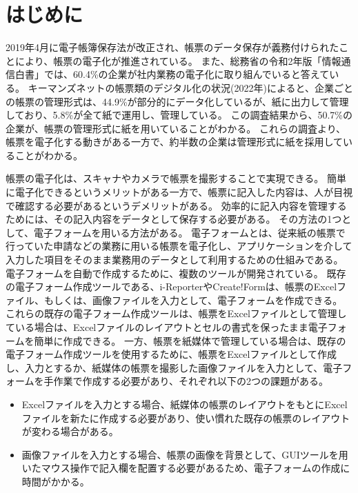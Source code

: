 \chapter{はじめに}\label{cha:Introduction}
2019年4月に電子帳簿保存法が改正され、帳票のデータ保存が義務付けられたことにより、帳票の電子化が推進されている\cite{電子帳簿保存法}。
また、総務省の令和2年版「情報通信白書」では、60.4\%の企業が社内業務の電子化に取り組んでいると答えている\cite{デジタルデータの経済的価値の計測と活用の現状に関する調査研究}。
キーマンズネットの帳票類のデジタル化の状況(2022年)によると、企業ごとの帳票の管理形式は、44.9\%が部分的にデータ化しているが、紙に出力して管理しており、5.8\%が全て紙で運用し、管理している\cite{帳票類のデジタル化の状況}。
この調査結果から、50.7\%の企業が、帳票の管理形式に紙を用いていることがわかる。
これらの調査より、帳票を電子化する動きがある一方で、約半数の企業は管理形式に紙を採用していることがわかる。

帳票の電子化は、スキャナやカメラで帳票を撮影することで実現できる。
簡単に電子化できるというメリットがある一方で、帳票に記入した内容は、人が目視で確認する必要があるというデメリットがある。
効率的に記入内容を管理するためには、その記入内容をデータとして保存する必要がある。
その方法の1つとして、電子フォームを用いる方法がある。
電子フォームとは、従来紙の帳票で行っていた申請などの業務に用いる帳票を電子化し、アプリケーションを介して入力した項目をそのまま業務用のデータとして利用するための仕組みである\cite{電子フォーム}。
電子フォームを自動で作成するために、複数のツールが開発されている。
既存の電子フォーム作成ツールである、i-Reporter\cite{i-Reporter}やCreate!Form\cite{Create!Form}は、帳票のExcelファイル、もしくは、画像ファイルを入力として、電子フォームを作成できる。
これらの既存の電子フォーム作成ツールは、帳票をExcelファイルとして管理している場合は、Excelファイルのレイアウトとセルの書式を保ったまま電子フォームを簡単に作成できる。
一方、帳票を紙媒体で管理している場合は、既存の電子フォーム作成ツールを使用するために、帳票をExcelファイルとして作成し、入力とするか、紙媒体の帳票を撮影した画像ファイルを入力として、電子フォームを手作業で作成する必要があり、それぞれ以下の2つの課題がある。

\begin{itemize}
  \item Excelファイルを入力とする場合、紙媒体の帳票のレイアウトをもとにExcelファイルを新たに作成する必要があり、使い慣れた既存の帳票のレイアウトが変わる場合がある。
  \item 画像ファイルを入力とする場合、帳票の画像を背景として、GUIツールを用いたマウス操作で記入欄を配置する必要があるため、電子フォームの作成に時間がかかる。
\end{itemize}

